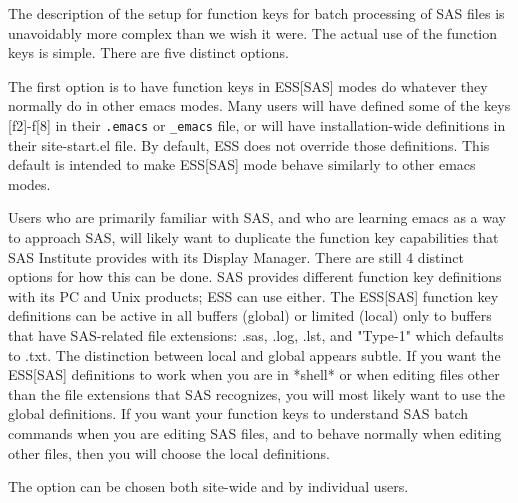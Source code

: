 \documentclass{article}
\begin{document}
The description of the setup for function keys for batch processing of
SAS files is unavoidably more complex than we wish it were.  The actual
use of the function keys is simple.  There are five distinct options.

The first option is to have function keys in ESS[SAS] modes do
whatever they normally do in other emacs modes.  Many users will have
defined some of the keys [f2]-f[8] in their \verb+.emacs+ or
\verb|_emacs| file, or will have installation-wide definitions in
their site-start.el file.  By default, ESS does not override those
definitions.  This default is intended to make ESS[SAS] mode behave
similarly to other emacs modes.

Users who are primarily familiar with SAS, and who are learning emacs
as a way to approach SAS, will likely want to duplicate the function
key capabilities that SAS Institute provides with its Display Manager.
There are still 4 distinct options for how this can be done.  SAS
provides different function key definitions with its PC and Unix
products; ESS can use either.  The ESS[SAS] function key definitions
can be active in all buffers (global) or limited (local) only to
buffers that have SAS-related file extensions: .sas, .log, .lst, and
"Type-1" which defaults to .txt.  The distinction between local and
global appears subtle.  If you want the ESS[SAS] definitions to work
when you are in *shell* or when editing files other than the file
extensions that SAS recognizes, you will most likely want to use the
global definitions.  If you want your function keys to understand SAS
batch commands when you are editing SAS files, and to behave normally
when editing other files, then you will choose the local definitions.

The option can be chosen both site-wide and by individual users.

\end{document}
